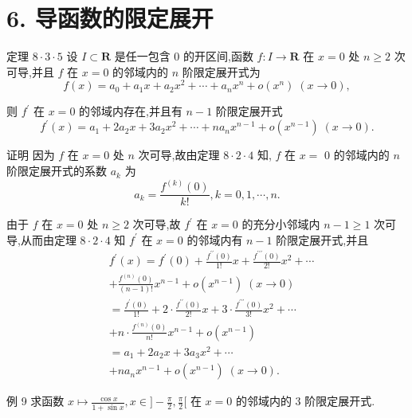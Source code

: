 \section*{6. 导函数的限定展开}

定理 $8 \cdot  3 \cdot  5$ 设 $I \subset  \mathbf{R}$ 是任一包含 0 的开区间,函数 $f : I \rightarrow  \mathbf{R}$ 在 $x = 0$ 处 $n \geq  2$ 次可导,并且 $f$ 在 $x = 0$ 的邻域内的 $n$ 阶限定展开式为
$$f\left( x\right)  = {a}_{0} + {a}_{1}x + {a}_{2}{x}^{2} + \cdots  + {a}_{n}{x}^{n} + o\left( {x}^{n}\right) \;\left( {x \rightarrow  0}\right) ,$$

则 ${f}^{\prime }$ 在 $x = 0$ 的邻域内存在,并且有 $n - 1$ 阶限定展开式
$${f}^{\prime }\left( x\right)  = {a}_{1} + 2{a}_{2}x + 3{a}_{2}{x}^{2} + \cdots  + n{a}_{n}{x}^{n - 1} + o\left( {x}^{n - 1}\right) \;\left( {x \rightarrow  0}\right) .$$

证明 因为 $f$ 在 $x = 0$ 处 $n$ 次可导,故由定理 $8 \cdot  2 \cdot  4$ 知, $f$ 在 $x =$ 0 的邻域内的 $n$ 阶限定展开式的系数 ${a}_{k}$ 为
$${a}_{k} = \frac{{f}^{\left( k\right) }\left( 0\right) }{k!},k = 0,1,\cdots ,n.$$

由于 $f$ 在 $x = 0$ 处 $n \geq  2$ 次可导,故 ${f}^{\prime }$ 在 $x = 0$ 的充分小邻域内 $n - 1 \geq  1$ 次可导,从而由定理 $8 \cdot  2 \cdot  4$ 知 ${f}^{\prime }$ 在 $x = 0$ 的邻域内有 $n - 1$ 阶限定展开式,并且
\begin{align*}
	&{f}^{\prime }\left( x\right)  = {f}^{\prime }\left( 0\right)  + \frac{{f}^{\prime \prime }\left( 0\right) }{1!}x + \frac{{f}^{\prime \prime \prime }\left( 0\right) }{2!}{x}^{2} + \cdots\\
	&+ \frac{{f}^{\left( n\right) }\left( 0\right) }{\left( {n - 1}\right) !}{x}^{n - 1} + o\left( {x}^{n - 1}\right) \;\left( {x \rightarrow  0}\right)\\
	&= \frac{{f}^{\prime }\left( 0\right) }{1!} + 2 \cdot  \frac{{f}^{\prime \prime }\left( 0\right) }{2!}x + 3 \cdot  \frac{{f}^{\prime \prime \prime }\left( 0\right) }{3!}{x}^{2} + \cdots\\
	&+ n \cdot  \frac{{f}^{\left( n\right) }\left( 0\right) }{n!}{x}^{n - 1} + o\left( {x}^{n - 1}\right)\\
	&= {a}_{1} + 2{a}_{2}x + 3{a}_{3}{x}^{2} + \cdots\\
	&+ n{a}_{n}{x}^{n - 1} + o\left( {x}^{n - 1}\right) \;\left( {x \rightarrow  0}\right) .
\end{align*}

例 9 求函数 $x \mapsto  \frac{\cos x}{1 + \sin x},x \in  \rbrack  - \frac{\pi }{2},\frac{\pi }{2}\lbrack$ 在 $x = 0$ 的邻域内的 3 阶限定展开式.

